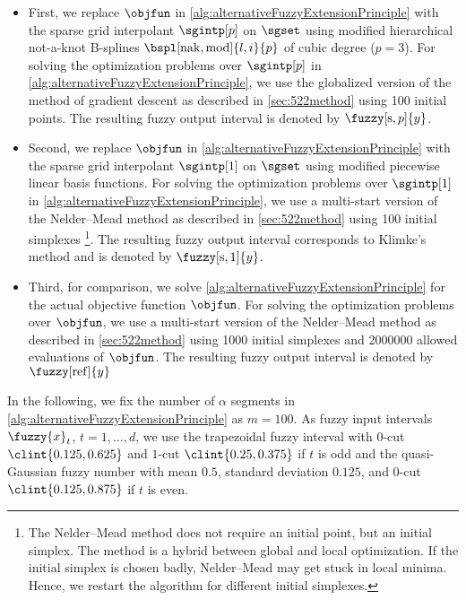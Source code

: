 \begin{itemize}
  \item
  First,
  we replace $\objfun$ in \cref{alg:alternativeFuzzyExtensionPrinciple}
  with the sparse grid interpolant $\sgintp[p]$
  on $\sgset$ using modified hierarchical not-a-knot B-splines
  $\bspl[\nak,\modified]{l,i}{p}$ of cubic degree ($p = 3$).
  For solving the optimization problems over $\sgintp[p]$ in
  \cref{alg:alternativeFuzzyExtensionPrinciple},
  we use the globalized version of the method of gradient descent
  as described in \cref{sec:522method} using 100 initial points.
  The resulting fuzzy output interval is denoted by $\fuzzy[\sparse,p]{y}$.
  
  \item
  Second,
  we replace $\objfun$ in \cref{alg:alternativeFuzzyExtensionPrinciple}
  with the sparse grid interpolant $\sgintp[1]$
  on $\sgset$ using modified piecewise linear basis functions.
  For solving the optimization problems over $\sgintp[1]$ in
  \cref{alg:alternativeFuzzyExtensionPrinciple},
  we use a multi-start version of the Nelder--Mead method
  as described in \cref{sec:522method}
  using 100 initial simplexes%
  \footnote{%
    The Nelder--Mead method does not require an initial point,
    but an initial simplex.
    The method is a hybrid between global and local optimization.
    If the initial simplex is chosen badly, Nelder--Mead may get stuck
    in local minima.
    Hence, we restart the algorithm for different initial simplexes.%
  }.
  The resulting fuzzy output interval corresponds to Klimke's method and
  is denoted by $\fuzzy[\sparse,1]{y}$.
  
  \item
  Third,
  for comparison, we solve
  \cref{alg:alternativeFuzzyExtensionPrinciple} for the
  actual objective function $\objfun$.
  For solving the optimization problems over $\objfun$,
  we use a multi-start version of the Nelder--Mead method
  as described in \cref{sec:522method}
  using 1000 initial simplexes
  and \num{2000000} allowed evaluations of $\objfun$.
  The resulting fuzzy output interval is denoted by $\fuzzy[\reference]{y}$
\end{itemize}

\noindent
In the following, we fix the number of $\alpha$ segments
in \cref{alg:alternativeFuzzyExtensionPrinciple} as $m = 100$.
As fuzzy input intervals $\fuzzy{x}_t$, $t = 1, \dotsc, d$, we use
the trapezoidal fuzzy interval with $0$-cut $\clint{0.125, 0.625}$
and $1$-cut $\clint{0.25, 0.375}$ if $t$ is odd and
the quasi-Gaussian fuzzy number with mean $0.5$, standard deviation $0.125$,
and $0$-cut $\clint{0.125, 0.875}$ if $t$ is even.

